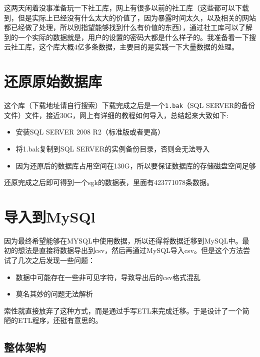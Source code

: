 \documentclass[12pt]{article}
\begin{document}
\makeblogtitle

这两天闲着没事准备玩一下社工库，网上有很多以前的社工库（这些都可以下载到，但是实际上已经没有什么太大的价值了，因为暴露时间太久，以及相关的网站都已经做了处理，所以别指望能够找到什么有价值的东西），通过社工库可以了解到的一个实际的数据就是，用户的设置的密码大都是什么样子的。我准备看一下搜云社工库，这个库大概4亿多条数据，主要目的是实践一下大量数据的处理。

\section{还原原始数据库}\label{ux8fd8ux539fux539fux59cbux6570ux636eux5e93}

这个库（下载地址请自行搜索）下载完成之后是一个\texttt{1.bak}（SQL SERVER的备份文件）文件，接近30G，网上有详细的教程如何导入，总结起来大致如下:

\begin{itemize}
\tightlist
\item
  安装SQL SERVER 2008 R2（标准版或者更高）
\item
  将1.bak复制到SQL SERVER的实例备份目录，否则会无法导入
\item
  因为还原后的数据库占用空间在130G，所以要保证数据库的存储磁盘空间足够
\end{itemize}

还原完成之后即可得到一个sgk的数据表，里面有423771078条数据。

\section{导入到MySQl}\label{ux5bfcux5165ux5230mysql}

因为最终希望能够在MYSQL中使用数据，所以还得将数据迁移到MySQL中。最初的想法是直接将数据导出到csv，然后再通过MySQL导入csv。但是这个方法尝试了几次之后发现一些问题：

\begin{itemize}
\tightlist
\item
  数据中可能存在一些非可见字符，导致导出后的csv格式混乱
\item
  莫名其妙的问题无法解析
\end{itemize}

索性就直接放弃了这种方式，而是通过手写ETL来完成迁移。于是设计了一个简陋的ETL程序，还挺有意思的。

\subsection{整体架构}\label{ux6574ux4f53ux67b6ux6784}
\end{document}
